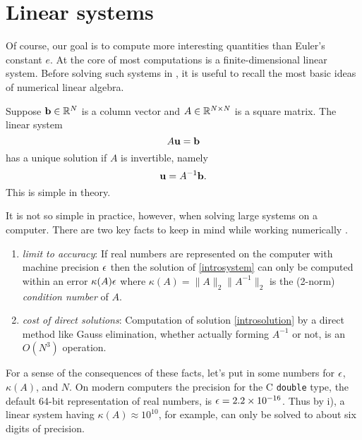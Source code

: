 \section{Linear systems}

Of course, our goal is to compute more interesting quantities than Euler's constant $e$.  At the core of most \PETSc computations is a finite-dimensional linear system.  Before solving such systems in \PETSc, it is useful to recall the most basic ideas of numerical linear algebra.

Suppose $\mathbf{b}\in \mathbb{R}^{N}$ is a column vector and $A\in\mathbb{R}^{N\times N}$ is a square matrix.  The linear system
\begin{equation}
A \mathbf{u} = \mathbf{b} \label{introsystem}
\end{equation}
has a unique solution if $A$ is invertible, namely
\begin{equation}
\mathbf{u} = A^{-1} \mathbf{b}. \label{introsolution}
\end{equation}
This is simple in theory.

It is not so simple in practice, however, when solving large systems on a computer.  There are two key facts to keep in mind while working numerically  \citep{TrefethenBau}.
\renewcommand{\labelenumi}{\roman{enumi})}
\begin{enumerate}
\item \emph{limit to accuracy}:  If real numbers are represented on the computer with machine precision $\epsilon$ then the solution of \eqref{introsystem} can only be computed within an error $\kappa(A) \epsilon$ where $\kappa(A) = \|A\|_2 \|A^{-1}\|_2$ is the (2-norm) \emph{condition number} of $A$.
\item \emph{cost of direct solutions}:  Computation of solution \eqref{introsolution} by a direct method like Gauss elimination, whether actually forming $A^{-1}$ or not, is an $O(N^3)$ operation.
\end{enumerate}

For a sense of the consequences of these facts, let's put in some numbers for $\epsilon$, $\kappa(A)$, and $N$.  On modern computers the precision for the C \texttt{double} type, the default 64-bit representation of real numbers, is $\epsilon = 2.2 \times 10^{-16}$.  Thus by i), a linear system having $\kappa(A) \approx 10^{10}$, for example, can only be solved to about six digits of precision.


